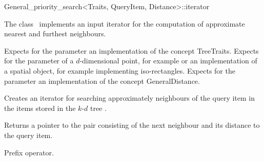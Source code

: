 

\begin{ccRefClass}{General_priority_search<Traits, QueryItem, Distance>::iterator}  %


\ccDefinition

The class \ccRefName\ implements an input iterator
for the computation of approximate nearest and furthest neighbours.


\ccParameters

Expects for the parameter  an implementation of the concept TreeTraits.
Expects for the parameter   of a $d$-dimensional point, for example 
or an implementation of a spatial object, for
example  implementing iso-rectangles.
Expects for the parameter  an implementation of the
concept GeneralDistance.

\ccCreation
{}  %

{Creates an iterator for searching approximately neighbours of the query item 
in the items stored in the $k$-$d$ tree .}


{Returns a pointer to the pair consisting of the next neighbour and its distance
to the query item.}

{Prefix operator.}


\end{ccRefClass}
